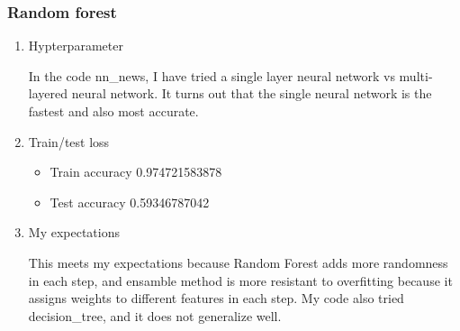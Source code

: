 \documentclass[letterpaper, 12]{article}
\begin{document}
\subsubsection{Random forest}
\begin{enumerate}

    \item Hypterparameter
	
	In the code nn\_news, I have tried a single layer neural network vs multi-layered neural network. It turns out that the single neural network is the fastest and also most accurate.

	\item Train/test loss
	\begin{itemize}
     \item  Train accuracy 0.974721583878
     \item Test accuracy 0.59346787042
        \end{itemize}
      \item My expectations
      
      This meets my expectations because Random Forest adds more randomness in each step, and ensamble method is more resistant to overfitting because it assigns weights to different features in each step. My code also tried decision\_tree, and it does not generalize well.
  
\end{enumerate}
\end{document}
